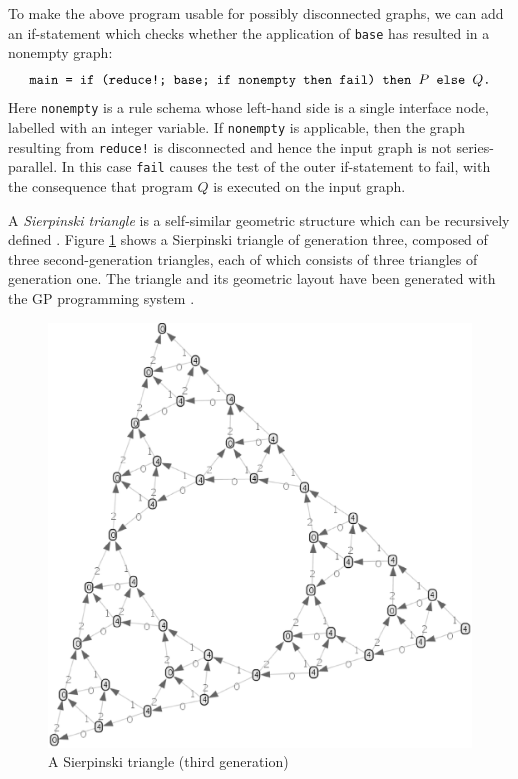 \begin{example}
To make the above program usable for possibly disconnected graphs, we can add an if-statement which checks whether the application of \texttt{base} has resulted in a nonempty graph: 
\[ \text{\texttt{main = if (reduce!; base; if nonempty then fail) then $P$\/ else $Q$.}} \]
Here \texttt{nonempty} is a rule schema whose left-hand side is a single interface node, labelled with an integer variable. If \texttt{nonempty} is applicable, then the graph resulting from \texttt{reduce!} is disconnected and hence the input graph is not series-parallel. In this case \texttt{fail} causes the test of the outer if-statement to fail, with the consequence that program $Q$ is executed on the input graph.
\end{example}

\begin{example}
\label{ex:sierpinski}
A \emph{Sierpinski triangle} is a self-similar geometric structure which can be recursively defined \cite{Peitgen-Juergens-Saupe04a}. Figure \ref{fig:sierpinski} shows a Sierpinski triangle of generation three, composed of three second-generation triangles, each of which consists of three triangles of generation one. The triangle and its geometric layout have been generated with the GP programming system \cite{Taentzer_et_al08a,Manning-Plump08b}.

\begin{figure}[htb]
 \begin{center}
  \includegraphics[scale=.35,angle=-15]{sierpinski-3.eps}
 \end{center}
\vspace*{-2.5cm}
\caption{A Sierpinski triangle (third generation)\label{fig:sierpinski}}
\end{figure}


\end{example}

